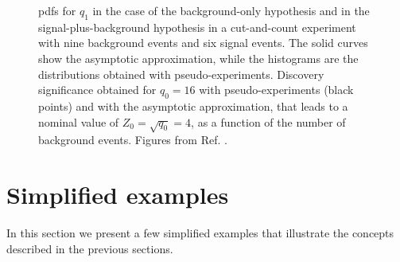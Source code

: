 \begin{figure}[h]
\centering 
{}
\caption{
 \glspl{pdf} for $q_1$ in the case of the background-only hypothesis and in the signal-plus-background hypothesis
in a cut-and-count experiment with nine background events and six signal events.
The solid curves show the asymptotic approximation, while the histograms are the distributions obtained with pseudo-experiments. 
 Discovery significance obtained for $q_0=16$ with pseudo-experiments (black points) and with the asymptotic approximation, that leads to a nominal value of $Z_0 = \sqrt{q_0} =4$, as a function of the number of background events. 
Figures from Ref. \cite{Cowan2011}.
}
\label{fig:stat:interp}
\end{figure}



\section{Simplified examples}
\label{sec:stat:examples}

In this section we present a few simplified examples that illustrate the concepts described in the previous sections.

